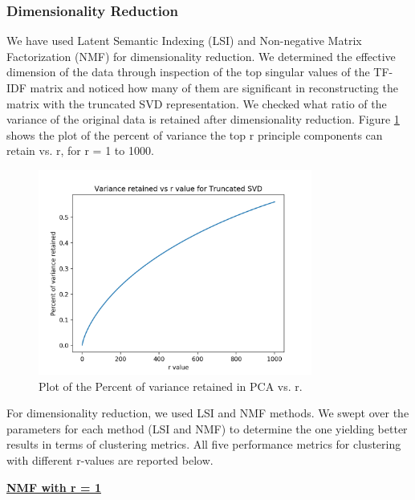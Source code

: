 \documentclass{article}
\begin{document}
\subsubsection{Dimensionality Reduction}
We have used Latent Semantic Indexing (LSI) and Non-negative Matrix Factorization (NMF) for dimensionality reduction. We determined the effective dimension of the data through inspection of the top singular values of the TF\--IDF matrix and noticed how many of them are significant in reconstructing the matrix with the truncated SVD representation. We checked what ratio of the variance of the original data is retained after dimensionality reduction. Figure \ref{fig:variance_r} shows the plot of the percent of variance the top r principle components can retain vs. r, for r = 1 to 1000.


\begin{figure}[!ht]
  	\centering
  	\includegraphics[width=90mm]{p3_variance_r.png}
  	\vspace*{-3mm}
  	\caption{Plot of the Percent of variance retained in PCA vs. r.}
  	\label{fig:variance_r}
\end{figure}


For dimensionality reduction, we used LSI and NMF methods. We swept over the parameters for each method (LSI and NMF) to determine the one yielding better results in terms of clustering metrics. All five performance metrics for clustering with different r-values are reported below. \\
\newpage


\underline{\textbf{NMF with r = 1}} 
\end{document}

